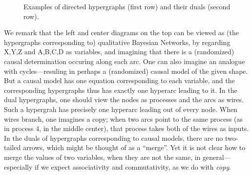 \begin{figure}
    \hfill
    \caption[Examples of directed hypergraphs and their duals]
    {Examples of directed hypergraphs (first row) and their duals (second row).}
        \label{fig:dhygraph-duals}
\end{figure}%
We remark that
the left and center diagrams on the top can be viewed as (the hypergraphs corresponding to) qualitative Bayesian Networks, by regarding X,Y,Z and A,B,C,D as variables, and imagining that there is a (randomized) causal determination occuring along each arc. 
One can also imagine an analogue with cycles---resuling in perhaps a (randomized) causal model of the given shape.  But a causal model has one equation corresponding to each variable, and the corresponding hypergraphs thus has exactly one hyperarc leading to it. 
In the dual hypergraphs, one should view the nodes as processes and the arcs as wires. Such a hypergrah has precisely one hyperarc leading out of every node. When wires branch, one imagines a copy; when two arcs point to the same process (as in process 4, in the middle center), that process takes both of the wires as inputs.
In the duals of hypergraphs corresponding to causal models, there are no two-tailed arrows, which might be thought of as a ``merge''. 
Yet it is not clear how to merge the values of two variables, when they are not the same, in general---especially if we expect associativity and commutativity, as we do with \emph{copy}. 


